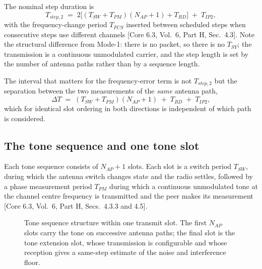 \documentclass[11pt,a4paper]{article}
\newcommand{\Tsw}{T_{SW}}
\newcommand{\Tpm}{T_{PM}}
\newcommand{\Trd}{T_{RD}}
\newcommand{\Tipp}{T_{IP2}}
\newcommand{\Nap}{N_{AP}}
\newcommand{\core}[1]{\textcolor{rulegrey}{\small[Core 6.3, #1]}}
\begin{document}
The nominal step duration is
\begin{equation}
T_{step,2} \;=\; 2\bigl[(\Tsw+\Tpm)(\Nap+1) + \Trd\bigr] \;+\; \Tipp ,
\label{eq:stepdur}
\end{equation}
with the frequency-change period $T_{FCS}$ inserted between scheduled steps when consecutive steps
use different channels \core{Vol.\ 6, Part H, Sec.\ 4.3}. Note the structural difference from
Mode-1: there is no packet, so there is no $T_{SY}$; the transmission is a continuous unmodulated
carrier, and the step length is set by the number of antenna paths rather than by a sequence length.

The interval that matters for the frequency-error term is not $T_{step,2}$ but the separation
between the two measurements of the \emph{same} antenna path,
\begin{equation}
\Delta T \;=\; (\Tsw+\Tpm)(\Nap+1) \;+\; \Trd \;+\; \Tipp ,
\label{eq:deltaT}
\end{equation}
which for identical slot ordering in both directions is independent of which path is considered.

\subsection{The tone sequence and one tone slot}

Each tone sequence consists of $\Nap+1$ slots. Each slot is a switch period $\Tsw$, during which the
antenna switch changes state and the radio settles, followed by a phase measurement period $\Tpm$
during which a continuous unmodulated tone at the channel centre frequency is transmitted and the
peer makes its measurement \core{Vol.\ 6, Part H, Secs.\ 4.3.3 and 4.5}.

\begin{figure}[h]
\centering
{}
\caption{Tone sequence structure within one transmit slot. The first $\Nap$ slots carry the tone on
successive antenna paths; the final slot is the tone extension slot, whose transmission is
configurable and whose reception gives a same-step estimate of the noise and interference floor.}
\label{fig:tonesequence}
\end{figure}
\end{document}

